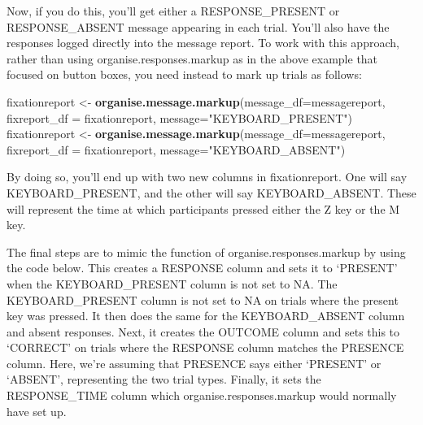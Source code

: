 \documentclass[]{book}
\newenvironment{Shaded}{\begin{snugshade}}{\end{snugshade}}
\newcommand{\DataTypeTok}[1]{\textcolor[rgb]{0.13,0.29,0.53}{#1}}
\newcommand{\KeywordTok}[1]{\textcolor[rgb]{0.13,0.29,0.53}{\textbf{#1}}}
\newcommand{\NormalTok}[1]{#1}
\newcommand{\StringTok}[1]{\textcolor[rgb]{0.31,0.60,0.02}{#1}}
\begin{document}
Now, if you do this, you'll get either a RESPONSE\_PRESENT or RESPONSE\_ABSENT message appearing in each trial. You'll also have the responses logged directly into the message report. To work with this approach, rather than using organise.responses.markup as in the above example that focused on button boxes, you need instead to mark up trials as follows:

\begin{Shaded}
\begin{Highlighting}[]
\NormalTok{fixationreport <-}\StringTok{ }\KeywordTok{organise.message.markup}\NormalTok{(}\DataTypeTok{message_df=}\NormalTok{messagereport, }
                                          \DataTypeTok{fixreport_df =}\NormalTok{ fixationreport, }\DataTypeTok{message=}\StringTok{"KEYBOARD_PRESENT"}\NormalTok{)}
\NormalTok{fixationreport <-}\StringTok{ }\KeywordTok{organise.message.markup}\NormalTok{(}\DataTypeTok{message_df=}\NormalTok{messagereport, }
                                          \DataTypeTok{fixreport_df =}\NormalTok{ fixationreport, }\DataTypeTok{message=}\StringTok{"KEYBOARD_ABSENT"}\NormalTok{)}
\end{Highlighting}
\end{Shaded}

By doing so, you'll end up with two new columns in fixationreport. One will say KEYBOARD\_PRESENT, and the other will say KEYBOARD\_ABSENT. These will represent the time at which participants pressed either the Z key or the M key.

The final steps are to mimic the function of organise.responses.markup by using the code below. This creates a RESPONSE column and sets it to `PRESENT' when the KEYBOARD\_PRESENT column is not set to NA. The KEYBOARD\_PRESENT column is not set to NA on trials where the present key was pressed. It then does the same for the KEYBOARD\_ABSENT column and absent responses. Next, it creates the OUTCOME column and sets this to `CORRECT' on trials where the RESPONSE column matches the PRESENCE column. Here, we're assuming that PRESENCE says either `PRESENT' or `ABSENT', representing the two trial types. Finally, it sets the RESPONSE\_TIME column which organise.responses.markup would normally have set up.
\end{document}
